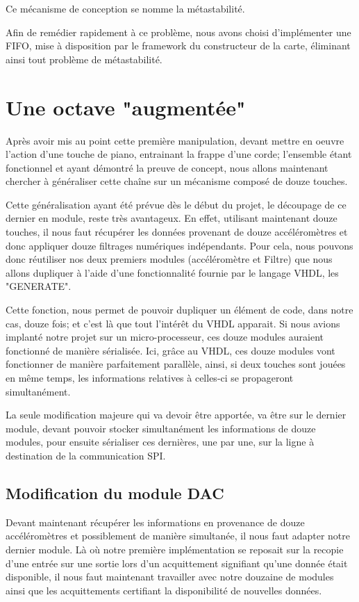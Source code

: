 \documentclass[french,a4paper,12pt]{report}
\begin{document}
	Ce mécanisme de conception se nomme la métastabilité.
	
	Afin de remédier rapidement à ce problème, nous avons choisi d'implémenter une FIFO, mise à disposition par le framework du constructeur de la carte, éliminant ainsi tout problème de métastabilité.		
		
	\chapter{Une octave "augmentée"}
		Après avoir mis au point cette première manipulation, devant mettre en oeuvre l'action d'une touche de piano, entrainant la frappe d'une corde; l'ensemble étant fonctionnel et ayant démontré la preuve de concept, nous allons maintenant chercher à généraliser cette chaîne sur un mécanisme composé de douze touches.
		
		Cette généralisation ayant été prévue dès le début du projet, le découpage de ce dernier en module, reste très avantageux. En effet, utilisant maintenant douze touches, il nous faut récupérer les données provenant de douze accéléromètres et donc appliquer douze filtrages numériques indépendants. Pour cela, nous pouvons donc réutiliser nos deux premiers modules (accéléromètre et Filtre) que nous allons dupliquer à l'aide d'une fonctionnalité fournie par le langage VHDL, les "GENERATE".
		
		Cette fonction, nous permet de pouvoir dupliquer un élément de code, dans notre cas, douze fois; et c'est là que tout l'intérêt du VHDL apparait. Si nous avions implanté notre projet sur un micro-processeur, ces douze modules auraient fonctionné de manière sérialisée. Ici, grâce au VHDL, ces douze modules vont fonctionner de manière parfaitement parallèle, ainsi, si deux touches sont jouées en même temps, les informations relatives à celles-ci se propageront simultanément.
		
		La seule modification majeure qui va devoir être apportée, va être sur le dernier module, devant pouvoir stocker simultanément les informations de douze modules, pour ensuite sérialiser ces dernières, une par une, sur la ligne à destination de la communication SPI.
		
		\newpage
		
	\section{Modification du module DAC}
		Devant maintenant récupérer les informations en provenance de douze accéléromètres et possiblement de manière simultanée, il nous faut adapter notre dernier module. Là où notre première implémentation se reposait sur la recopie d'une entrée sur une sortie lors d'un acquittement signifiant qu'une donnée était disponible, il nous faut maintenant travailler avec notre douzaine de modules ainsi que les acquittements certifiant la disponibilité de nouvelles données.
		
\end{document}
